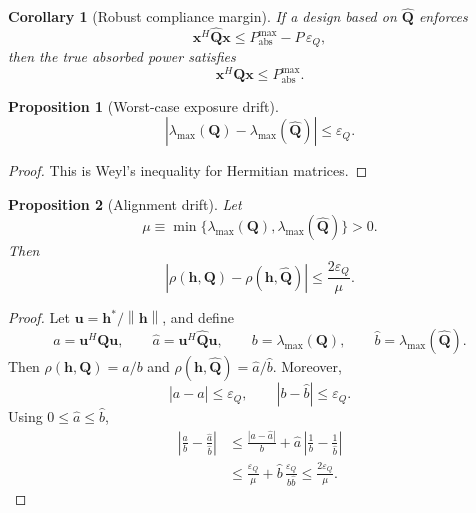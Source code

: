 \documentclass[11pt]{article}
\newtheorem{proposition}{Proposition}
\newtheorem{corollary}{Corollary}
\newcommand{\hh}{\mathbf{h}}
\newcommand{\QQ}{\mathbf{Q}}
\newcommand{\x}{\mathbf{x}}
\newcommand{\norm}[1]{\left\lVert #1 \right\rVert}
\newcommand{\abs}[1]{\left\lvert #1 \right\rvert}
\begin{document}
\begin{corollary}[Robust compliance margin]
If a design based on $\widehat{\QQ}$ enforces
\begin{equation}
  \x^H\widehat{\QQ}\x \le P_{\mathrm{abs}}^{\max} - P\,\varepsilon_Q,
\end{equation}
then the true absorbed power satisfies
\begin{equation}
  \x^H\QQ\x \le P_{\mathrm{abs}}^{\max}.
\end{equation}
\end{corollary}

\begin{proposition}[Worst-case exposure drift]
\begin{equation}
  \abs{\lambda_{\max}(\QQ)-\lambda_{\max}(\widehat{\QQ})}
  \le \varepsilon_Q.
\end{equation}
\end{proposition}

\begin{proof}
This is Weyl's inequality for Hermitian matrices.
\end{proof}

\begin{proposition}[Alignment drift]
Let
\begin{equation}
  \mu \equiv
  \min\!\bigl\{\lambda_{\max}(\QQ),\lambda_{\max}(\widehat{\QQ})\bigr\}
  > 0.
\end{equation}
Then
\begin{equation}
  \abs{\rho(\hh,\QQ)-\rho(\hh,\widehat{\QQ})}
  \le \frac{2\varepsilon_Q}{\mu}.
\end{equation}
\end{proposition}

\begin{proof}
Let $\mathbf{u}=\hh^*/\norm{\hh}$, and define
\begin{equation}
  a=\mathbf{u}^H\QQ\mathbf{u},
  \qquad
  \widehat{a}=\mathbf{u}^H\widehat{\QQ}\mathbf{u},
  \qquad
  b=\lambda_{\max}(\QQ),
  \qquad
  \widehat{b}=\lambda_{\max}(\widehat{\QQ}).
\end{equation}
Then $\rho(\hh,\QQ)=a/b$ and $\rho(\hh,\widehat{\QQ})=\widehat{a}/\widehat{b}$.
Moreover,
\begin{equation}
  \abs{a-\widehat{a}} \le \varepsilon_Q,
  \qquad
  \abs{b-\widehat{b}} \le \varepsilon_Q.
\end{equation}
Using $0\le \widehat{a}\le \widehat{b}$,
\begin{align}
  \abs{\frac{a}{b}-\frac{\widehat{a}}{\widehat{b}}}
  &\le \frac{\abs{a-\widehat{a}}}{b}
  + \widehat{a}\,\abs{\frac{1}{b}-\frac{1}{\widehat{b}}}
  \\
  &\le \frac{\varepsilon_Q}{\mu}
  + \widehat{b}\,\frac{\varepsilon_Q}{b\widehat{b}}
  \le \frac{2\varepsilon_Q}{\mu}.
\end{align}
\end{proof}
\end{document}
